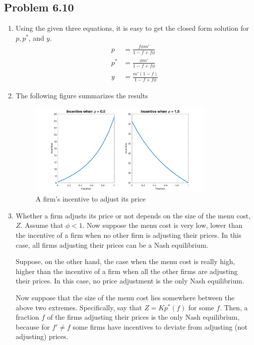 \documentclass[11pt]{amsart}
\begin{document}
\subsection{Problem 6.10}
\begin{enumerate}[label=(\alph*)]
	\item Using the given three equations, it is easy to get the closed form solution for $p, p^{*}$, and $y$. 
	\begin{align*}
	p & = \frac{f \phi m'}{1 - f + f\phi} \\
	p^{*} & = \frac{\phi m'}{1 - f + f\phi} \\
	y & = \frac{m' (1-f)}{1 - f + f\phi}
	\end{align*}
	\item The following figure summarizes the results
	\begin{figure}[H]
		\centering
		\includegraphics[width=0.85\textwidth]{611b}
		\caption{A firm's incentive to adjust its price}
	\end{figure}
	\item Whether a firm adjusts its price or not depends on the size of the menu cost, $Z$. Assume that $\phi <1$. Now suppose the menu cost is very low, lower than the incentive of a firm when no other firm is adjusting their prices. In this case, all firms adjusting their prices can be a Nash equilibrium. 
	
	Suppose, on the other hand, the case when the menu cost is really high, higher than the incentive of a firm when all the other firms are adjusting their prices. In this case, no price adjustment is the only Nash equilibrium. 
	
	Now suppose that the size of the menu cost lies somewhere between the above two extremes. Specifically, say that $Z = K p^{*} (f)$ for some $f$. Then, a fraction $f$ of the firms adjusting their prices is the only Nash equilibrium, because for $f' \neq f$ some firms have incentives to deviate from adjusting (not adjusting) prices. 
\end{enumerate}
\end{document}
